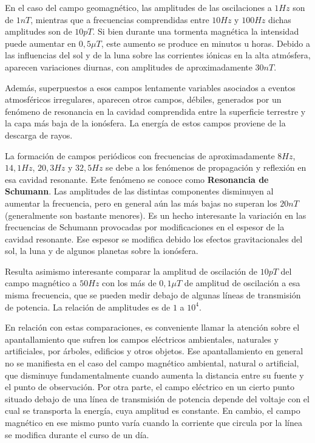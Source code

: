 En el caso del campo geomagnético, las amplitudes de las oscilaciones a $1 Hz$ son de $1 nT$, mientras que a frecuencias comprendidas entre $10 Hz$ y $100 Hz$ dichas amplitudes son de $10 pT$.
Si bien durante una tormenta magnética la intensidad puede aumentar en $0,5 \mu T$, este aumento se produce en minutos u horas.
Debido a las influencias del sol y de la luna sobre las corrientes iónicas en la alta atmósfera, aparecen variaciones diurnas, con amplitudes de aproximadamente $30 nT$.

Además, superpuestos a esos campos lentamente variables asociados a eventos atmosféricos irregulares, aparecen otros campos, débiles, generados por un fenómeno de resonancia en la cavidad comprendida entre la superficie terrestre y la capa más baja de la ionósfera. La energía de estos campos proviene de la descarga de rayos.

La formación de campos periódicos con frecuencias de aproximadamente $8 Hz$, $14,1 Hz$, $20,3 Hz$ y $32,5 Hz$ se debe a los fenómenos de propagación y reflexión en esa cavidad resonante. Este fenómeno se conoce como \textbf{Resonancia de Schumann}.
Las amplitudes de las distintas componentes disminuyen al aumentar la frecuencia, pero en general aún las más bajas no superan los $20 nT$ (generalmente son bastante menores).
Es un hecho interesante la variación en las frecuencias de Schumann provocadas por modificaciones en el espesor de la cavidad resonante. Ese espesor se modifica debido los efectos gravitacionales del sol, la luna y de algunos planetas sobre la ionósfera.

Resulta asimismo interesante comparar la amplitud de oscilación de $10 pT$ del campo magnético a $50 Hz$ con los más de $0,1 \mu T$ de amplitud de oscilación a esa misma frecuencia, que se pueden medir debajo de algunas líneas de transmisión de potencia. La relación de amplitudes es de $1$ a $10^{4}$.

En relación con estas comparaciones, es conveniente llamar la atención sobre el apantallamiento que sufren los campos eléctricos ambientales, naturales y artificiales, por árboles, edificios y otros objetos.
Ese apantallamiento en general no se manifiesta en el caso del campo magnético ambiental, natural o artificial, que disminuye fundamentalmente cuando aumenta la distancia entre su fuente y el punto de observación.
Por otra parte, el campo eléctrico en un cierto punto situado debajo de una línea de transmisión de potencia depende del voltaje con el cual se transporta la energía, cuya amplitud es constante. En cambio, el campo magnético en ese mismo punto varía cuando la corriente que circula por la línea se modifica durante el curso de un día.

